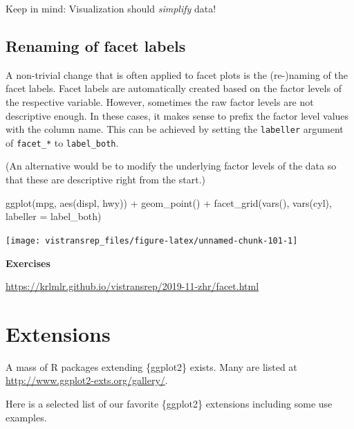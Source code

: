 \documentclass[]{book}
\newenvironment{Shaded}{}{}
\newcommand{\DataTypeTok}[1]{#1}
\newcommand{\KeywordTok}[1]{\textcolor[rgb]{0.00,0.00,1.00}{#1}}
\newcommand{\NormalTok}[1]{#1}
\newcommand{\OperatorTok}[1]{#1}
\newcommand{\StringTok}[1]{\textcolor[rgb]{0.00,0.50,0.50}{#1}}
\begin{document}
Keep in mind: Visualization should \emph{simplify} data!

\hypertarget{renaming-of-facet-labels}{%
\subsection{Renaming of facet labels}\label{renaming-of-facet-labels}}

A non-trivial change that is often applied to facet plots is the (re-)naming of the facet labels.
Facet labels are automatically created based on the factor levels of the respective variable.
However, sometimes the raw factor levels are not descriptive enough.
In these cases, it makes sense to prefix the factor level values with the column name.
This can be achieved by setting the \texttt{labeller} argument of \texttt{facet\_*} to \texttt{label\_both}.

(An alternative would be to modify the underlying factor levels of the data so that these are descriptive right from the start.)

\begin{Shaded}
\begin{Highlighting}[]
\KeywordTok{ggplot}\NormalTok{(mpg, }\KeywordTok{aes}\NormalTok{(displ, hwy)) }\OperatorTok{+}
\StringTok{  }\KeywordTok{geom_point}\NormalTok{() }\OperatorTok{+}
\StringTok{  }\KeywordTok{facet_grid}\NormalTok{(}\KeywordTok{vars}\NormalTok{(), }\KeywordTok{vars}\NormalTok{(cyl), }\DataTypeTok{labeller =}\NormalTok{ label_both)}
\end{Highlighting}
\end{Shaded}

\begin{flushright}\texttt{[image: vistransrep\_files/figure-latex/unnamed-chunk-101-1]} \end{flushright}

\textbf{Exercises}

\url{https://krlmlr.github.io/vistransrep/2019-11-zhr/facet.html}

\hypertarget{extensions}{%
\section{Extensions}\label{extensions}}

A mass of R packages extending \{ggplot2\} exists.
Many are listed at \url{http://www.ggplot2-exts.org/gallery/}.

Here is a selected list of our favorite \{ggplot2\} extensions including some use examples.
\end{document}
